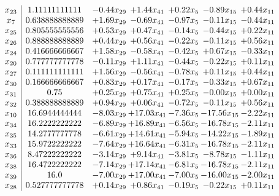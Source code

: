 \documentclass[8pt]{article}
\begin{document}
\[\begin{array}{c| c c@{\hskip 2pt} c@{\hskip 2pt} c@{\hskip 2pt} c@{\hskip 2pt} c@{\hskip 2pt} }
 x_{23}   &  1.11111111111 & -0.44 x_{29} & +  1.44 x_{41} & +  0.22 x_{5} & -0.89 x_{15} & +  0.44 x_{11}\\
 x_{7}   &  0.638888888889 & +  1.69 x_{29} & -0.69 x_{41} & -0.97 x_{5} & -0.11 x_{15} & -0.44 x_{11}\\
 x_{25}   &  0.805555555556 & +  0.53 x_{29} & +  0.47 x_{41} & -0.14 x_{5} & -0.44 x_{15} & +  0.22 x_{11}\\
 x_{26}   &  0.888888888889 & +  0.44 x_{29} & +  0.56 x_{41} & -0.22 x_{5} & -0.11 x_{15} & +  0.56 x_{11}\\
 x_{24}   &  0.416666666667 & +  1.58 x_{29} & -0.58 x_{41} & -0.42 x_{5} & +  0.67 x_{15} & -0.33 x_{11}\\
 x_{20}   &  0.777777777778 & -0.11 x_{29} & +  1.11 x_{41} & -0.44 x_{5} & -0.22 x_{15} & +  0.11 x_{11}\\
 x_{27}   &  0.111111111111 & +  1.56 x_{29} & -0.56 x_{41} & -0.78 x_{5} & +  0.11 x_{15} & +  0.44 x_{11}\\
 x_{30}   &  0.166666666667 & +  0.83 x_{29} & +  0.17 x_{41} & -0.17 x_{5} & -0.33 x_{15} & +  0.67 x_{11}\\
 x_{31}   &  0.75 & +  0.25 x_{29} & +  0.75 x_{41} & +  0.25 x_{5} & -0.00 x_{15} & +  0.00 x_{11}\\
 x_{32}   &  0.388888888889 & +  0.94 x_{29} & +  0.06 x_{41} & -0.72 x_{5} & -0.11 x_{15} & +  0.56 x_{11}\\
 x_{10}   &  16.6944444444 & -8.03 x_{29} & + 17.03 x_{41} & -7.36 x_{5} & -17.56 x_{15} & -2.22 x_{11}\\
 x_{34}   &  16.2222222222 & -6.89 x_{29} & + 16.89 x_{41} & -6.56 x_{5} & -16.78 x_{15} & -2.11 x_{11}\\
 x_{35}   &  14.2777777778 & -6.61 x_{29} & + 14.61 x_{41} & -5.94 x_{5} & -14.22 x_{15} & -1.89 x_{11}\\
 x_{33}   &  15.9722222222 & -7.64 x_{29} & + 16.64 x_{41} & -6.31 x_{5} & -16.78 x_{15} & -2.11 x_{11}\\
 x_{36}   &  8.47222222222 & -3.14 x_{29} & +  9.14 x_{41} & -3.81 x_{5} & -8.78 x_{15} & -1.11 x_{11}\\
 x_{38}   &  16.4722222222 & -7.14 x_{29} & + 17.14 x_{41} & -6.81 x_{5} & -16.78 x_{15} & -2.11 x_{11}\\
 x_{39}   &  16.0 & -7.00 x_{29} & + 17.00 x_{41} & -7.00 x_{5} & -16.00 x_{15} & -2.00 x_{11}\\
 x_{28}   &  0.527777777778 & +  0.14 x_{29} & +  0.86 x_{41} & -0.19 x_{5} & -0.22 x_{15} & +  0.11 x_{11}\\

\end{array}\]
\end{document}
